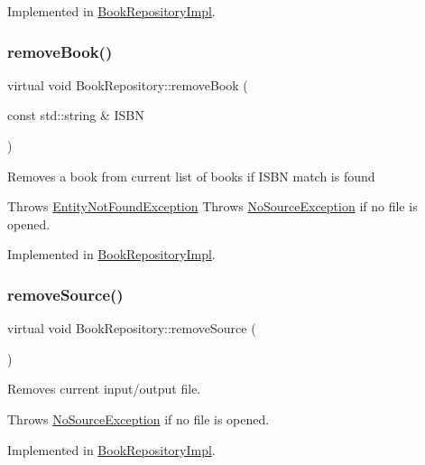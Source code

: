 Implemented in \hyperlink{classBookRepositoryImpl_ab41594acd9ec505c0eaa048fa1ae2c19}{Book\+Repository\+Impl}.

\mbox{\label{classBookRepository_a2e0c4e643ea43750b99c2a380dc1e43d}} 
\subsubsection{\texorpdfstring{remove\+Book()}{removeBook()}}
{\footnotesize\ttfamily virtual void Book\+Repository\+::remove\+Book (\begin{DoxyParamCaption}\item[{const std\+::string \&}]{I\+S\+BN }\end{DoxyParamCaption})\hspace{0.3cm}{\ttfamily [pure virtual]}}

Removes a book from current list of books if I\+S\+BN match is found

Throws \hyperlink{structEntityNotFoundException}{Entity\+Not\+Found\+Exception} Throws \hyperlink{structNoSourceException}{No\+Source\+Exception} if no file is opened. 

Implemented in \hyperlink{classBookRepositoryImpl_aefed48951263bb21153b24fd7bcf0e1c}{Book\+Repository\+Impl}.

\mbox{\label{classBookRepository_ab1645ea5f97fd9d1ae5395b8234a3b7a}} 
\subsubsection{\texorpdfstring{remove\+Source()}{removeSource()}}
{\footnotesize\ttfamily virtual void Book\+Repository\+::remove\+Source (\begin{DoxyParamCaption}{ }\end{DoxyParamCaption})\hspace{0.3cm}{\ttfamily [pure virtual]}}

Removes current input/output file.

Throws \hyperlink{structNoSourceException}{No\+Source\+Exception} if no file is opened. 

Implemented in \hyperlink{classBookRepositoryImpl_a1550bae55aa379da68b4391bcc0648eb}{Book\+Repository\+Impl}.

